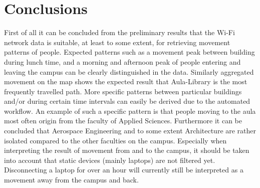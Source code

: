 \chapter{Conclusions}\label{conclusion}
First of all it can be concluded from the preliminary results that the Wi-Fi network data is suitable, at least to some extent, for retrieving movement patterns of people. Expected patterns such as a movement peak between building during lunch time, and a morning and afternoon peak of people entering and leaving the campus can be clearly distinguished in the data. Similarly aggregated movement on the map shows the expected result that Aula-Library is the most frequently travelled path. More specific patterns between particular buildings and/or during certain time intervals can easily be derived due to the automated workflow. An example of such a specific pattern is that people moving to the aula most often origin from the faculty of Applied Sciences. Furthermore it can be concluded that Aerospace Engineering and to some extent Architecture are rather isolated compared to the other faculties on the campus. Especially when interpreting the result of movement from and to the campus, it should be taken into account that static devices (mainly laptops) are not filtered yet. Disconnecting a laptop for over an hour will currently still be interpreted as a movement away from the campus and back.